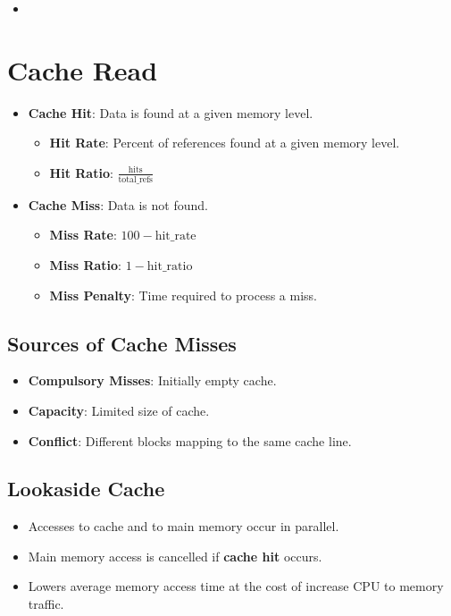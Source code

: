 \documentclass[12pt, letterpaper]{article}
\begin{document}
\begin{itemize}
  \item
\end{itemize}

\section*{Cache Read}

\begin{itemize}
  \item \textbf{Cache Hit}: Data is found at a given memory level.
    \begin{itemize}
      \item \textbf{Hit Rate}: Percent of references found at a given
        memory level.
      \item \textbf{Hit Ratio}: $ \displaystyle
        \frac{\textrm{hits}}{\textrm{total\_refs}} $
    \end{itemize}
  \item \textbf{Cache Miss}: Data is not found.
    \begin{itemize}
      \item \textbf{Miss Rate}: $ 100 - \textrm{hit\_rate} $
      \item \textbf{Miss Ratio}: $ 1 - \textrm{hit\_ratio} $
      \item \textbf{Miss Penalty}: Time required to process a miss.
    \end{itemize}
\end{itemize}

\subsection*{Sources of Cache Misses}

\begin{itemize}
  \item \textbf{Compulsory Misses}: Initially empty cache.
  \item \textbf{Capacity}: Limited size of cache.
  \item \textbf{Conflict}: Different blocks mapping to the same cache line.
\end{itemize}

\subsection*{Lookaside Cache}

\begin{itemize}
  \item Accesses to cache and to main memory occur in parallel.
  \item Main memory access is cancelled if \textbf{cache hit} occurs.
  \item Lowers average memory access time at the cost of increase CPU
    to memory traffic.
\end{itemize}
\end{document}
